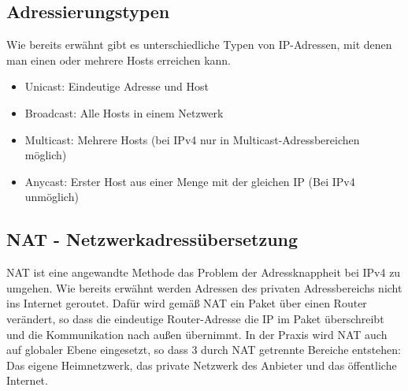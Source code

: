 \subsection{Adressierungstypen}

Wie bereits erwähnt gibt es unterschiedliche Typen von IP-Adressen, mit denen man einen oder mehrere Hosts erreichen kann.

\begin{itemize}
    \item Unicast: Eindeutige Adresse und Host
    \item Broadcast: Alle Hosts in einem Netzwerk
    \item Multicast: Mehrere Hosts (bei IPv4 nur in Multicast-Adressbereichen möglich)
    \item Anycast: Erster Host aus einer Menge mit der gleichen IP (Bei IPv4 unmöglich)
\end{itemize}

\subsection{NAT - Netzwerkadressübersetzung}

NAT ist eine angewandte Methode das Problem der Adressknappheit bei IPv4 zu umgehen. Wie bereits erwähnt werden Adressen des privaten Adressbereichs nicht ins Internet geroutet. Dafür wird gemäß NAT ein Paket über einen Router verändert, so dass die eindeutige Router-Adresse die IP im Paket überschreibt und die Kommunikation nach außen übernimmt. In der Praxis wird NAT auch auf globaler Ebene eingesetzt, so dass 3 durch NAT getrennte Bereiche entstehen: Das eigene Heimnetzwerk, das private Netzwerk des Anbieter und das öffentliche Internet.
